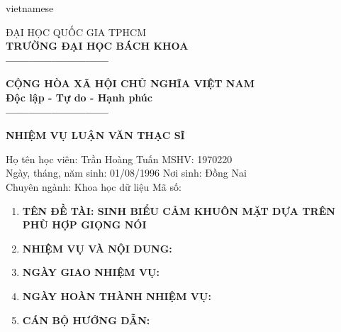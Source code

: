 \begin{titlepage}
\begin{otherlanguage*}{vietnamese}

    \begin{minipage}[t]{0.42\textwidth}
        \begin{center}
            ĐẠI HỌC QUỐC GIA TPHCM\\
            \textbf{TRƯỜNG ĐẠI HỌC BÁCH KHOA}\\
            \textbf{---------------------------}\\
        \end{center}
    \end{minipage}
    \noindent
    \begin{minipage}[t]{0.57\textwidth}
        \begin{center}
            \textbf{CỘNG HÒA XÃ HỘI CHỦ NGHĨA VIỆT NAM}\\
            \textbf{Độc lập - Tự do - Hạnh phúc}\\
            \textbf{---------------------------}\\
        \end{center}
    \end{minipage}

    \begin{center}
        \fontsize{18}{18}\textbf{NHIỆM VỤ LUẬN VĂN THẠC SĨ}
    \end{center}

    \begin{flushleft}
        Họ tên học viên: Trần Hoàng Tuấn
        \tabto{10cm}
        MSHV: 1970220\\
        Ngày, tháng, năm sinh: 01/08/1996
        \tabto{10cm}
        Nơi sinh: Đồng Nai\\
        Chuyên ngành: Khoa học dữ liệu
        \tabto{10cm}
        Mã số:\\

        \renewcommand{\labelenumi}{\Roman{enumi}}
        \begin{enumerate}
            \item \textbf{TÊN ĐỀ TÀI: SINH BIỂU CẢM KHUÔN MẶT DỰA TRÊN PHÙ HỢP GIỌNG NÓI}
            \item \textbf{NHIỆM VỤ VÀ NỘI DUNG:}
            \item \textbf{NGÀY GIAO NHIỆM VỤ:}
            \item \textbf{NGÀY HOÀN THÀNH NHIỆM VỤ:}
            \item \textbf{CÁN BỘ HƯỚNG DẪN:}
        \end{enumerate}
    \end{flushleft}


\end{otherlanguage*}
\end{titlepage}
